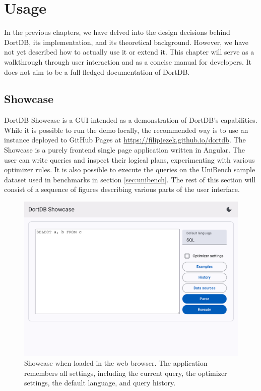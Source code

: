 \chapter{Usage}
\label{chap:usage}

In the previous chapters, we have delved into the design decisions behind DortDB, its implementation, and its theoretical background. However, we have not yet described how to actually use it or extend it. This chapter will serve as a walkthrough through user interaction and as a concise manual for developers. It does not aim to be a full-fledged documentation of DortDB.

\section{Showcase}

DortDB Showcase is a GUI intended as a demonstration of DortDB's capabilities. While it is possible to run the demo locally, the recommended way is to use an instance deployed to GitHub Pages at \url{https://filipjezek.github.io/dortdb}. The Showcase is a purely frontend single page application written in Angular. The user can write queries and inspect their logical plans, experimenting with various optimizer rules. It is also possible to execute the queries on the UniBench sample dataset used in benchmarks in section \ref{sec:unibench}. The rest of this section will consist of a sequence of figures describing various parts of the user interface.

\begin{figure}[!h]
    \centering
    \includegraphics[width=0.8\linewidth]{img/showcase_initial.png}
    \caption{Showcase when loaded in the web browser. The application remembers all settings, including the current query, the optimizer settings, the default language, and query history.}
\end{figure}

